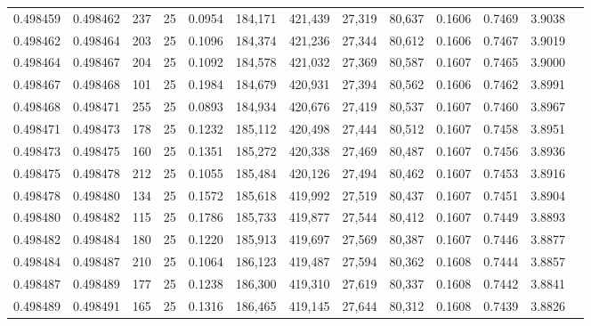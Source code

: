 \begin{tabular}{rrrrrrrrrrrrr}
0.498459 & 0.498462 & 237 &  25 &                                     0.0954 & 184,171 & 421,439 &  27,319 &  80,637 & 0.1606 & 0.7469 & 3.9038 \\
0.498462 & 0.498464 & 203 &  25 &                                     0.1096 & 184,374 & 421,236 &  27,344 &  80,612 & 0.1606 & 0.7467 & 3.9019 \\
0.498464 & 0.498467 & 204 &  25 &                                     0.1092 & 184,578 & 421,032 &  27,369 &  80,587 & 0.1607 & 0.7465 & 3.9000 \\
0.498467 & 0.498468 & 101 &  25 &                                     0.1984 & 184,679 & 420,931 &  27,394 &  80,562 & 0.1606 & 0.7462 & 3.8991 \\
0.498468 & 0.498471 & 255 &  25 &                                     0.0893 & 184,934 & 420,676 &  27,419 &  80,537 & 0.1607 & 0.7460 & 3.8967 \\
0.498471 & 0.498473 & 178 &  25 &                                     0.1232 & 185,112 & 420,498 &  27,444 &  80,512 & 0.1607 & 0.7458 & 3.8951 \\
0.498473 & 0.498475 & 160 &  25 &                                     0.1351 & 185,272 & 420,338 &  27,469 &  80,487 & 0.1607 & 0.7456 & 3.8936 \\
0.498475 & 0.498478 & 212 &  25 &                                     0.1055 & 185,484 & 420,126 &  27,494 &  80,462 & 0.1607 & 0.7453 & 3.8916 \\
0.498478 & 0.498480 & 134 &  25 &                                     0.1572 & 185,618 & 419,992 &  27,519 &  80,437 & 0.1607 & 0.7451 & 3.8904 \\
0.498480 & 0.498482 & 115 &  25 &                                     0.1786 & 185,733 & 419,877 &  27,544 &  80,412 & 0.1607 & 0.7449 & 3.8893 \\
0.498482 & 0.498484 & 180 &  25 &                                     0.1220 & 185,913 & 419,697 &  27,569 &  80,387 & 0.1607 & 0.7446 & 3.8877 \\
0.498484 & 0.498487 & 210 &  25 &                                     0.1064 & 186,123 & 419,487 &  27,594 &  80,362 & 0.1608 & 0.7444 & 3.8857 \\
0.498487 & 0.498489 & 177 &  25 &                                     0.1238 & 186,300 & 419,310 &  27,619 &  80,337 & 0.1608 & 0.7442 & 3.8841 \\
0.498489 & 0.498491 & 165 &  25 &                                     0.1316 & 186,465 & 419,145 &  27,644 &  80,312 & 0.1608 & 0.7439 & 3.8826 \\

\end{tabular}
